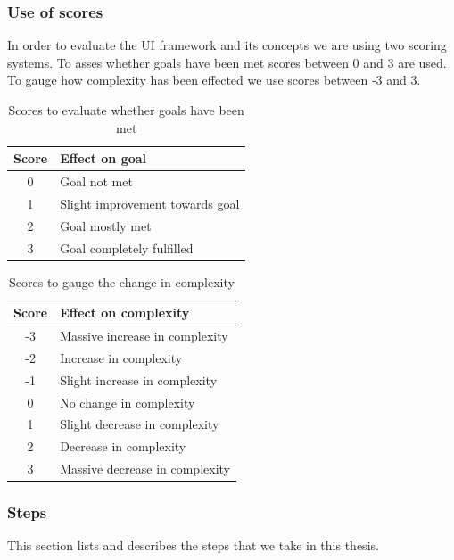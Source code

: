 \subsubsection{Use of scores}
In order to evaluate the UI framework and its concepts we are using two scoring systems. To asses whether goals have been met scores between 0 and 3 are used. To gauge how complexity has been effected we use scores between -3 and 3.

\begin{table}[]
  \begin{center}
    \begin{tabular}{|c|l|}
      \hline
      Score & Effect on goal \\
      \hline
      0 & Goal not met \\
      1 & Slight improvement towards goal \\
      2 & Goal mostly met \\
      3 & Goal completely fulfilled \\
      \hline
    \end{tabular}
    \caption{Scores to evaluate whether goals have been met}
  \end{center}
\end{table}

\begin{table}[]
  \begin{center}
    \begin{tabular}{|c|l|}
      \hline
      Score & Effect on complexity \\
      \hline
      -3 & Massive increase in complexity \\
      -2 & Increase in complexity \\
      -1 & Slight increase in complexity \\
      0 & No change in complexity \\
      1 & Slight decrease in complexity \\
      2 & Decrease in complexity \\
      3 & Massive decrease in complexity \\
      \hline
    \end{tabular}
    \caption{Scores to gauge the change in complexity}
  \end{center}
\end{table}

\subsubsection{Steps}
This section lists and describes the steps that we take in this thesis.

